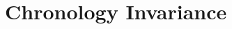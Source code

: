 \documentclass[11pt]{article}
\def\mo{\mathfrak{o}}
\theoremstyle{plain}
\theoremstyle{definition}
\DeclareMathOperator{\Q}{\mathbb{Q}}
\DeclareMathOperator{\calC}{\mathcal{C}}
\DeclareMathOperator{\calD}{\mathcal{D}}
\DeclareMathOperator{\calM}{\mathcal{M}}
\DeclareMathOperator{\calO}{\mathcal{O}}
\newcommand{\bb}[1]{\textcolor{blue}{#1}}
\begin{document}



 



%
\appendix

\section{Chronology Invariance}\label{sec:occFunctionalEx}
\end{document}
